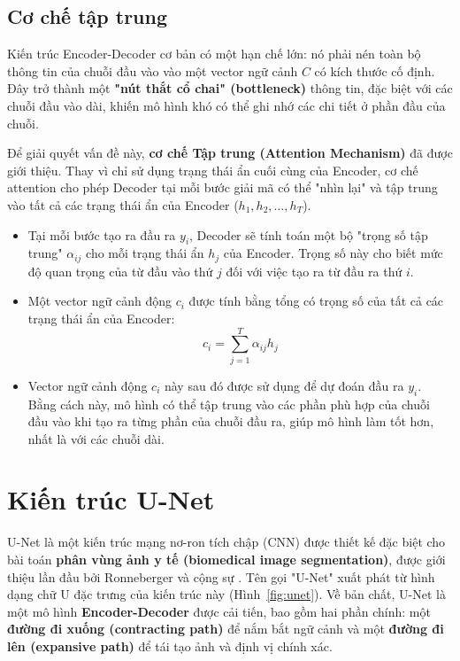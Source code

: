 \subsection{Cơ chế tập trung}
Kiến trúc Encoder-Decoder cơ bản có một hạn chế lớn: nó phải nén toàn bộ thông tin của chuỗi đầu vào vào một vector ngữ cảnh $C$ có kích thước cố định. Đây trở thành một \textbf{"nút thắt cổ chai" (bottleneck)} thông tin, đặc biệt với các chuỗi đầu vào dài, khiến mô hình khó có thể ghi nhớ các chi tiết ở phần đầu của chuỗi.

Để giải quyết vấn đề này, \textbf{cơ chế Tập trung (Attention Mechanism)} đã được giới thiệu. Thay vì chỉ sử dụng trạng thái ẩn cuối cùng của Encoder, cơ chế attention cho phép Decoder tại mỗi bước giải mã có thể "nhìn lại" và tập trung vào tất cả các trạng thái ẩn của Encoder ($h_1, h_2, \dots, h_T$).
\begin{itemize}
    \item Tại mỗi bước tạo ra đầu ra $y_i$, Decoder sẽ tính toán một bộ "trọng số tập trung" $\alpha_{ij}$ cho mỗi trạng thái ẩn $h_j$ của Encoder. Trọng số này cho biết mức độ quan trọng của từ đầu vào thứ $j$ đối với việc tạo ra từ đầu ra thứ $i$.
    \item Một vector ngữ cảnh động $c_i$ được tính bằng tổng có trọng số của tất cả các trạng thái ẩn của Encoder:
    \begin{equation}
        c_i = \sum_{j=1}^{T} \alpha_{ij} h_j
    \end{equation}
    \item Vector ngữ cảnh động $c_i$ này sau đó được sử dụng để dự đoán đầu ra $y_i$. Bằng cách này, mô hình có thể tập trung vào các phần phù hợp của chuỗi đầu vào khi tạo ra từng phần của chuỗi đầu ra, giúp mô hình làm tốt hơn, nhất là với các chuỗi dài.
\end{itemize}

\section{Kiến trúc U-Net}
U-Net là một kiến trúc mạng nơ-ron tích chập (CNN) được thiết kế đặc biệt cho bài toán \textbf{phân vùng ảnh y tế (biomedical image segmentation)}, được giới thiệu lần đầu bởi Ronneberger và cộng sự 
\cite{ronneberger2015unet}. Tên gọi "U-Net" xuất phát từ hình dạng chữ U đặc trưng của kiến trúc này (Hình~\ref{fig:unet}). Về bản chất, U-Net là một mô hình \textbf{Encoder-Decoder} được cải tiến, bao gồm hai phần chính: một \textbf{đường đi xuống (contracting path)} để nắm bắt ngữ cảnh và một \textbf{đường đi lên (expansive path)} để tái tạo ảnh và định vị chính xác.

